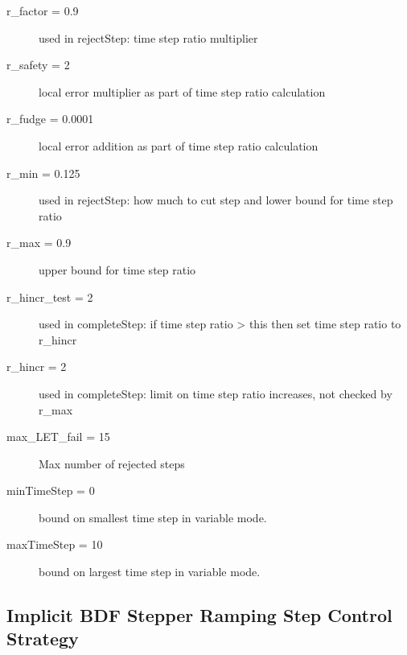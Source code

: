\begin{list}{}
\begin{description}
      \item[r\_factor = 0.9] 
used in rejectStep:  time step ratio multiplier
      \item[r\_safety = 2] 
local error multiplier as part of time step ratio calculation
      \item[r\_fudge = 0.0001] 
local error addition as part of time step ratio calculation
      \item[r\_min = 0.125] 
used in rejectStep:  how much to cut step and lower bound for time step ratio
      \item[r\_max = 0.9] 
upper bound for time step ratio
      \item[r\_hincr\_test = 2] 
used in completeStep:  if time step ratio > this then set time step ratio to r\_hincr
      \item[r\_hincr = 2] 
used in completeStep:  limit on time step ratio increases, not checked by r\_max
      \item[max\_LET\_fail = 15] 
Max number of rejected steps
      \item[minTimeStep = 0] 
bound on smallest time step in variable mode.
      \item[maxTimeStep = 10] 
bound on largest time step in variable mode.
\end{description}

\end{list}

\subsection{Implicit BDF Stepper Ramping Step Control Strategy}
\label{sec:Implicit BDF Stepper Ramping Step Control Strategy}

